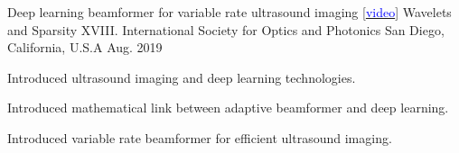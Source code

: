 \begin{cventries}
  \cventry
    {Deep learning beamformer for variable rate ultrasound imaging \href{https://youtu.be/1pzLPKOp9ZU}{[\textcolor{blue}{video}]}} %
    {Wavelets and Sparsity XVIII. International Society for Optics and Photonics} %
    {San Diego, California, U.S.A} %
    {Aug. 2019} %
    {
      \begin{cvitems} %
        \item {Introduced ultrasound imaging and deep learning technologies.}
        \item {Introduced mathematical link between adaptive beamformer and deep learning.}
        \item {Introduced variable rate beamformer for efficient ultrasound imaging.}
      \end{cvitems}
    }

\end{cventries}
